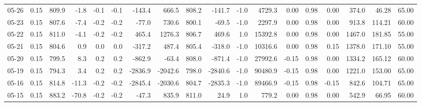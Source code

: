 \begin{threeparttable}
{\begin{tabular}{lrrrrrrrrrrrrrrrrr}
  05-26 &     0.15 & 809.9 &              -1.8 &              -0.1 &               -0.1 &             -143.4 &   666.5 & 808.2 &     -141.7 &                     -1.0 &              4729.3 &       0.00 &      0.98 &           0.00 &            374.0 &           46.28 &                  65.00 \\
  05-23 &     0.15 & 807.6 &              -7.4 &              -0.2 &               -0.2 &              -77.0 &   730.6 & 800.1 &      -69.5 &                     -1.0 &              2297.9 &       0.00 &      0.98 &           0.00 &            913.8 &          114.21 &                  60.00 \\
  05-22 &     0.15 & 811.0 &              -4.1 &              -0.2 &               -0.2 &              465.4 &  1276.3 & 806.7 &      469.6 &                      1.0 &             15392.8 &       0.00 &      0.98 &           0.00 &           1467.0 &          181.85 &                  55.00 \\
  05-21 &     0.15 & 804.6 &               0.9 &               0.0 &                0.0 &             -317.2 &   487.4 & 805.4 &     -318.0 &                     -1.0 &             10316.6 &       0.00 &      0.98 &           0.15 &           1378.0 &          171.10 &                  55.00 \\
  05-20 &     0.15 & 799.5 &               8.3 &               0.2 &                0.2 &             -862.9 &   -63.4 & 808.0 &     -871.4 &                     -1.0 &             27992.6 &      -0.15 &      0.98 &           0.00 &           1334.2 &          165.12 &                  60.00 \\
  05-19 &     0.15 & 794.3 &               3.4 &               0.2 &                0.2 &            -2836.9 & -2042.6 & 798.0 &    -2840.6 &                     -1.0 &             90480.9 &      -0.15 &      0.98 &           0.00 &           1221.0 &          153.00 &                  65.00 \\
  05-16 &     0.15 & 814.8 &             -11.3 &              -0.2 &               -0.2 &            -2845.4 & -2030.6 & 804.7 &    -2835.3 &                     -1.0 &             89466.9 &      -0.15 &      0.98 &          -0.15 &            842.6 &          104.71 &                  65.00 \\
  05-15 &     0.15 & 883.2 &             -70.8 &              -0.2 &               -0.2 &              -47.3 &   835.9 & 811.0 &       24.9 &                      1.0 &               779.2 &       0.00 &      0.98 &           0.00 &            542.9 &           66.95 &                  60.00 \\

\end{tabular}}
\end{threeparttable}
